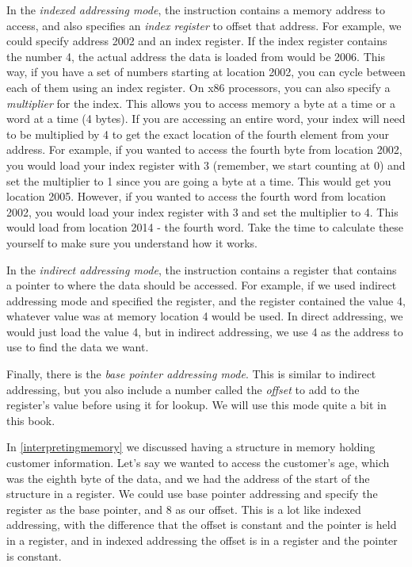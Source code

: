 In the \emph{indexed addressing mode}, the instruction contains
a memory address to access, and also specifies an \emph{index register} to offset that address.  For example, we could specify
address 2002 and an index register.  If the index register contains the
number 4, the actual address the data is loaded from would be 2006.  This
way, if you have a set of numbers starting at location 2002, you can cycle
between each of them using an index register.  On x86 processors, you can
also specify a \emph{multiplier} for the index.  This allows you to access
memory a byte at a time or a word at a time (4 bytes).  If you are accessing
an entire word, your index will need to be multiplied by 4 to get the exact
location of the fourth element from your address.  For example, if you wanted
to access the fourth byte from location 2002, you would load your index
register with 3 (remember, we start counting at 0) and set the multiplier
to 1 since you are going a byte at a time.  This would get you location
2005.  However, if you wanted to access the fourth word from location 2002,
you would load your index register with 3 and set the multiplier to 4. 
This would load from location 2014 - the fourth word.  Take the time to 
calculate these yourself to make sure you understand how it works.

In the \emph{indirect addressing mode}, the instruction contains
a register that contains a pointer to where the data should be accessed.
For example, if we used indirect addressing mode and specified the {\eaxReg} 
register, and the {\eaxReg} register contained the value 4, whatever value was 
at memory location 4 would be used.  In direct addressing, we would just 
load the value 4, but in indirect addressing, we use 4 as the address to use 
to find the data we want.

Finally, there is the \emph{base pointer addressing mode}.  This is
similar to indirect addressing, but you also include a number called the
\emph{offset} to add to the register's value before using it for lookup.  We will use this 
mode quite a bit in this book.

  
In \autoref{interpretingmemory} we discussed having a structure
in memory holding customer information.  Let's say we wanted to access
the customer's age, which was the eighth byte of the data, and we had the address 
of the start of the structure in a register.  We could use base pointer 
addressing and specify the register as the base pointer, and 8 as our offset.
This is a lot like indexed addressing, with the difference that the offset is
constant and the pointer is held in a register, and in indexed addressing
the offset is in a register and the pointer is constant.

